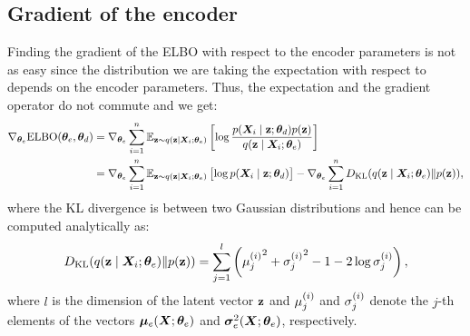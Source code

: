 \subsection{Gradient of the encoder}
Finding the gradient of the ELBO with respect to the encoder parameters is not as easy since the distribution we are taking the expectation with respect to depends on the encoder parameters. Thus, the expectation and the gradient operator do not commute and we get:
\begin{align}
    \nabla_{{\bm{\theta}}_e} \mathrm{ELBO}({\bm{\theta}}_e, {\bm{\theta}}_d) &= \nabla_{{\bm{\theta}}_e} \sum_{i=1}^n \mathbb{E}_{{\mathbf{z}} \sim q({\mathbf{z}} \mid {\bm{X}}_i; {\bm{\theta}}_e)} \left[\log \frac{p({\bm{X}}_i \mid {\mathbf{z}}; {\bm{\theta}}_d)p({\mathbf{z}})}{q({\mathbf{z}} \mid {\bm{X}}_i; {\bm{\theta}}_e)} \right] \nonumber\\
    &= \nabla_{{\bm{\theta}}_e} \sum_{i=1}^n \mathbb{E}_{{\mathbf{z}} \sim q({\mathbf{z}} \mid {\bm{X}}_i; {\bm{\theta}}_e)} \left[\log p({\bm{X}}_i \mid {\mathbf{z}}; {\bm{\theta}}_d) \right] - \nabla_{{\bm{\theta}}_e} \sum_{i=1}^n D_{\mathrm{KL}}(q({\mathbf{z}} \mid {\bm{X}}_i; {\bm{\theta}}_e) \Vert p({\mathbf{z}})) \label{eq:encoder_gradient},
\end{align}
where the KL divergence is between two Gaussian distributions and hence can be computed analytically as:
\begin{equation}
    D_{\mathrm{KL}}(q({\mathbf{z}} \mid {\bm{X}}_i; {\bm{\theta}}_e) \Vert p({\mathbf{z}})) = \sum_{j=1}^l \left({{\mu}_j^{(i)}}^2 + {{\sigma}_j^{(i)}}^2 -1 -2\log {{\sigma}_j^{(i)}}\right),
\end{equation}
where $l$ is the dimension of the latent vector ${\mathbf{z}}$ and ${\mu}_j^{(i)}$ and ${\sigma}_j^{(i)}$ denote the $j$-th elements of the vectors ${\bm{\mu}}_e({\bm{X}}; {\bm{\theta}}_e)$ and ${\bm{\sigma}}_e^2({\bm{X}}; {\bm{\theta}}_e)$, respectively.

